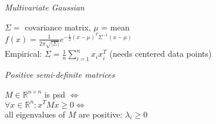 \emph{Multivariate Gaussian}

$\Sigma =$ covariance matrix, $\mu$ = mean\\
$f(x) = \frac{1}{2\pi \sqrt{|\Sigma|}} e^{- \frac{1}{2} (x-\mu)^T \Sigma^{-1} (x-\mu)}$\\
Empirical: $\Sigma = \frac{1}{n}\sum_{i=1}^n x_i x_i^T$ (needs centered data points)

\emph{Positive semi-definite matrices}

$M \in \mathbb{R}^{n\times n}$ is psd $\Leftrightarrow$\\
$\forall x \in \mathbb{R}^n: x^TMx \geq 0 \Leftrightarrow$\\
all eigenvalues of $M$ are positive: $\lambda_i\geq 0$

